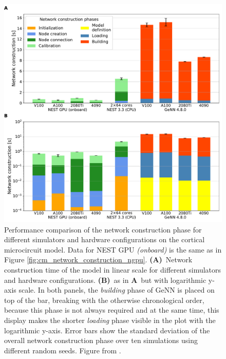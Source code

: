 \documentclass[a4paper, 12pt, twoside, openright]{book}
\begin{document}
\begin{figure}
    \centering
    \includegraphics[width=\columnwidth]{figures/cm_net_constr.pdf}
    \caption{Performance comparison of the network construction phase for different simulators and hardware configurations on the cortical microcircuit model. Data for NEST GPU \textit{(onboard)} is the same as in Figure \ref{fig:cm_network_construction_ngpu}.
    \textbf{(A)}~Network construction time of the model in linear scale for different simulators and hardware configurations.
    \textbf{(B)}~as in \textbf{A}~but with logarithmic y-axis scale.
    In both panels, the \textit{building} phase of GeNN is placed on top of the bar, breaking with the otherwise chronological order, because this phase is not always required and at the same time, this display makes the shorter \textit{loading} phase visible in the plot with the logarithmic y-axis.
    Error bars show the standard deviation of the overall network construction phase over ten simulations using different random seeds. Figure from \cite{Golosio2023}.}
    \label{fig:network_construction_ngpu_nest_genn}
\end{figure}
\end{document}
